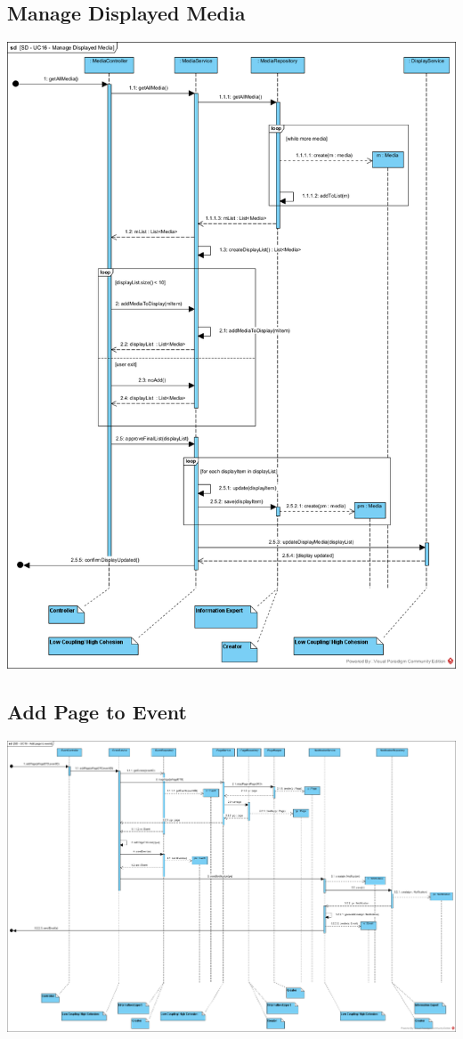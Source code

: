 \documentclass{article}
\begin{document}
\subsection{Manage Displayed Media}
        \includegraphics[scale=0.55]{images/SD-UC16-ManageDisplayedMedia.png}
        \label{fig:SD-ManageDisplayedMedia}
\subsection{Add Page to Event}
        \includegraphics[scale=0.35]{images/SD-UC18-AddPageToEvent.png}
        \label{fig:SD-AddPageToEvent}
\end{document}
